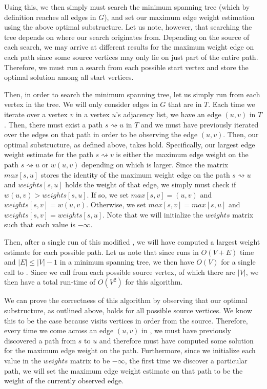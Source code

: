\documentclass[11pt]{article}
\begin{document}
Using this, we then simply must search the minimum spanning tree (which by definition reaches all edges in $G$), and set our maximum edge weight estimation using the above optimal substructure. Let us note, however, that searching the tree depends on where our search originates from. Depending on the source of each search, we may arrive at different results for the maximum weight edge on each path since some source vertices may only lie on just part of the entire path. Therefore, we must run a search from each possible start vertex and store the optimal solution among all start vertices.

Then, in order to search the minimum spanning tree, let us simply run  from each vertex in the tree. We will only consider edges in $G$ that are in $T$. Each time we iterate over a vertex $v$ in a vertex $u$'s adjacency list, we have an edge $(u,v)$ in $T$. Then, there must exist a path $s \rightsquigarrow u$ in $T$ and we must have previously iterated over the edges on that path in order to be observing the edge $(u,v)$. Then, our optimal substructure, as defined above, takes hold. Specifically, our largest edge weight estimate for the path $s \rightsquigarrow v$ is either the maximum edge weight on the path $s \rightsquigarrow u$ or $w(u,v)$ depending on which is larger. Since the matrix $max[s,u]$ stores the identity of the maximum weight edge on the path $s \rightsquigarrow u$ and $weights[s,u]$ holds the weight of that edge, we simply must check if $w(u,v) > weights[s,u]$. If so, we set $max[s,v] = (u,v)$ and $weights[s,v] = w(u,v)$. Otherwise, we set $max[s,v] = max[s,u]$ and $weights[s,v] = weights[s,u]$. Note that we will initialize the $weights$ matrix such that each value is $-\infty$.

Then, after a single run of this modified , we will have computed a largest weight estimate for each possible path. Let us note that since  runs in $O(V+E)$ time and $|E| \leq |V| - 1$ in a minimum spanning tree, we then have $O(V)$ for a single call to . Since we call  from each possible source vertex, of which there are $|V|$, we then have a total run-time of $O(V^2)$ for this algorithm.

We can prove the correctness of this algorithm by observing that our optimal substructure, as outlined above, holds for all possible source vertices. We know this to be the case because  visits vertices in order from the source. Therefore, every time we come across an edge $(u,v)$ in , we must have previously discovered a path from $s$ to $u$ and therefore must have computed some solution for the maximum edge weight on the path. Furthermore, since we initialize each value in the $weights$ matrix to be $-\infty$, the first time we discover a particular path, we will set the maximum edge weight estimate on that path to be the weight of the currently observed edge.
\end{document}
